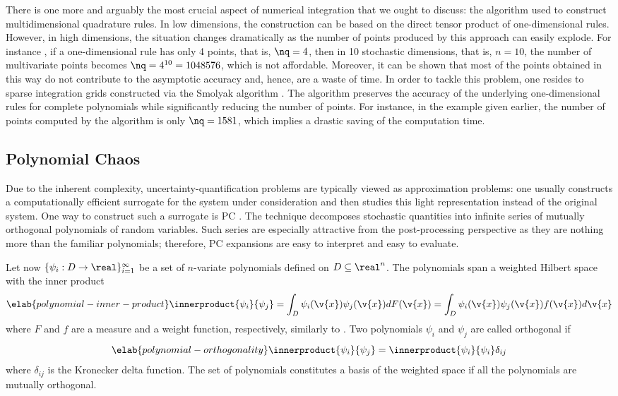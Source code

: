 There is one more and arguably the most crucial aspect of numerical integration
that we ought to discuss: the algorithm used to construct multidimensional
quadrature rules. In low dimensions, the construction can be based on the direct
tensor product of one-dimensional rules. However, in high dimensions, the
situation changes dramatically as the number of points produced by this approach
can easily explode. For instance \cite{heiss2008}, if a one-dimensional rule has
only 4 points, that is, $\nq = 4$, then in 10 stochastic dimensions, that is, $n
= 10$, the number of multivariate points becomes $\nq = 4^{10} = 1048576$, which
is not affordable. Moreover, it can be shown that most of the points obtained in
this way do not contribute to the asymptotic accuracy and, hence, are a waste of
time. In order to tackle this problem, one resides to sparse integration grids
constructed via the Smolyak algorithm \cite{burkardt, eldred2008, heiss2008}.
The algorithm preserves the accuracy of the underlying one-dimensional rules for
complete polynomials while significantly reducing the number of points. For
instance, in the example given earlier, the number of points computed by the
algorithm is only $\nq = 1581$, which implies a drastic saving of the
computation time.

\subsection{Polynomial Chaos}

Due to the inherent complexity, uncertainty-quantification problems are
typically viewed as approximation problems: one usually constructs a
computationally efficient surrogate for the system under consideration and then
studies this light representation instead of the original system. One way to
construct such a surrogate is \ac{PC} \cite{xiu2010}. The technique decomposes
stochastic quantities into infinite series of mutually orthogonal polynomials of
random variables. Such series are especially attractive from the post-processing
perspective as they are nothing more than the familiar polynomials; therefore,
\ac{PC} expansions are easy to interpret and easy to evaluate.

Let now $\{ \psi_i: D \to \real \}_{i = 1}^\infty$ be a set of $n$-variate
polynomials defined on $D \subseteq \real^n$. The polynomials span a weighted
Hilbert space with the inner product
\begin{equation} \elab{polynomial-inner-product}
  \innerproduct{\psi_i}{\psi_j}
  = \int_D \psi_i(\v{x}) \psi_j(\v{x}) dF(\v{x})
  = \int_D \psi_i(\v{x}) \psi_j(\v{x}) f(\v{x}) d\v{x}
\end{equation}
where $F$ and $f$ are a measure and a weight function, respectively, similarly
to . Two polynomials $\psi_i$ and $\psi_j$ are
called orthogonal if
\begin{equation} \elab{polynomial-orthogonality}
  \innerproduct{\psi_i}{\psi_j} = \innerproduct{\psi_i}{\psi_i} \delta_{ij}
\end{equation}
where $\delta_{ij}$ is the Kronecker delta function. The set of polynomials
constitutes a basis of the weighted space if all the polynomials are mutually
orthogonal.

